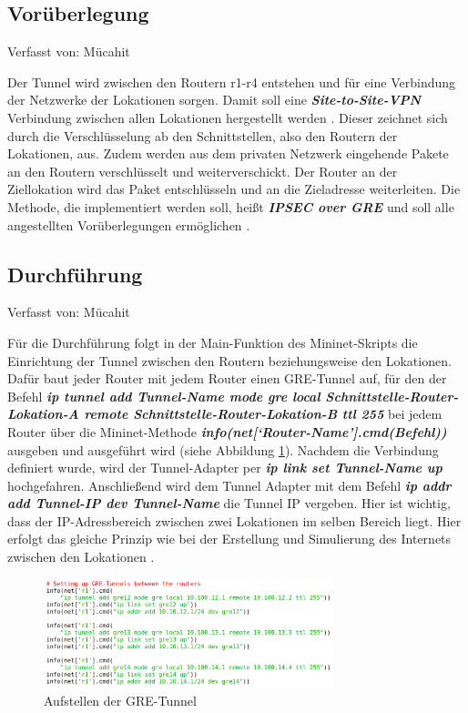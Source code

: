 \documentclass[fontsize=12pt,paper=a4,open=any,parskip=half,
  twoside=false,toc=listof,toc=bibliography,fleqn,leqno,
  captions=nooneline,captions=tableabove,british]{scrbook}
\begin{document}
\subsection{Vorüberlegung}
{\tiny Verfasst von: Mücahit\par}
Der Tunnel wird zwischen den Routern r1-r4 entstehen und für eine Verbindung der Netzwerke der Lokationen sorgen. Damit soll eine \textit{\textbf{Site-to-Site-VPN}} Verbindung zwischen allen Lokationen hergestellt werden \cite{sitetosite}. Dieser zeichnet sich durch die Verschlüsselung ab den Schnittstellen, also den Routern der Lokationen, aus. Zudem werden aus dem privaten Netzwerk eingehende Pakete an den Routern verschlüsselt und weiterverschickt. Der Router an der Ziellokation wird das Paket entschlüsseln und an die Zieladresse weiterleiten. Die Methode, die implementiert werden soll, heißt \textit{\textbf{IPSEC over GRE}} und soll alle angestellten Vorüberlegungen ermöglichen \cite{vpntunnel}.

\subsection{Durchführung}
{\tiny Verfasst von: Mücahit\par}
Für die Durchführung folgt in der Main-Funktion des Mininet-Skripts die Einrichtung der Tunnel zwischen den Routern beziehungsweise den Lokationen. Dafür baut jeder Router mit jedem Router einen GRE-Tunnel auf, für den der Befehl \textit{\textbf{ip tunnel add Tunnel-Name mode gre local Schnittstelle\hyp{}Router\hyp{}Lokation\hyp{}A remote Schnittstelle\hyp{}Router\hyp{}Lokation\hyp{}B ttl 255}} bei jedem Router über die Mininet-Methode \textit{\textbf{info(net[‘Router\hyp{}Name'].cmd(Befehl))}} ausgeben und ausgeführt wird (siehe Abbildung \ref{gre}). Nachdem die Verbindung definiert wurde, wird der Tunnel-Adapter per \textit{\textbf{ip link set Tunnel-Name up}} hochgefahren. Anschließend wird dem Tunnel Adapter mit dem Befehl \textit{\textbf{ip addr add Tunnel-IP dev Tunnel-Name}} die Tunnel IP vergeben. Hier ist wichtig, dass der IP-Adressbereich zwischen zwei Lokationen im selben Bereich liegt. Hier erfolgt das gleiche Prinzip wie bei der Erstellung und Simulierung des Internets zwischen den Lokationen \cite{tunnelimpl}.

\begin{figure}[H]
 \centering
 \includegraphics[width=0.75\textwidth]{Bilder/gre}
 \captionsetup{justification=centering,margin=2cm}
 \caption{Aufstellen der GRE-Tunnel}
 \label{gre}
\end{figure}
\end{document}
